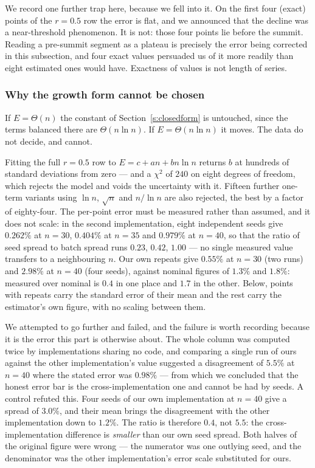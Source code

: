\documentclass[11pt,a4paper]{article}
\begin{document}
We record one further trap here, because we fell into it.  On the first four (exact) points of
the $r=0.5$ row the error is flat, and we announced that the decline was a near-threshold
phenomenon.  It is not: those four points lie before the summit.  Reading a pre-summit segment
as a plateau is precisely the error being corrected in this subsection, and four exact values
persuaded us of it more readily than eight estimated ones would have.  Exactness of values is
not length of series.

\subsubsection*{Why the growth form cannot be chosen}
If $E=\Theta(n)$ the constant of Section~\ref{s:closedform} is untouched, since the terms balanced there are
$\Theta(n\ln n)$.  If $E=\Theta(n\ln n)$ it moves.  The data do not decide, and cannot.

Fitting the full $r=0.5$ row to $E=c+an+bn\ln n$ returns $b$ at hundreds of standard deviations
from zero --- and a $\chi^2$ of $240$ on eight degrees of freedom, which rejects the model and
voids the uncertainty with it.  Fifteen further one-term variants using $\ln n$, $\sqrt n$ and
$n/\ln n$ are also rejected, the best by a factor of eighty-four.  The per-point error must be measured rather than assumed, and it does not scale: in the second
implementation, eight independent seeds give $0.262\%$ at $n=30$, $0.404\%$ at $n=35$ and
$0.979\%$ at $n=40$, so that the ratio of seed spread to batch spread runs $0.23$, $0.42$, $1.00$
--- no single measured value transfers to a neighbouring $n$.  Our own repeats give $0.55\%$ at
$n=30$ (two runs) and $2.98\%$ at $n=40$ (four seeds), against nominal figures of $1.3\%$ and
$1.8\%$: measured over nominal is $0.4$ in one place and $1.7$ in the other.  Below, points with
repeats carry the standard error of their mean and the rest carry the estimator's own figure,
with no scaling between them.

We attempted to go further and failed, and the failure is worth recording because it is the
error this part is otherwise about.  The whole column was computed twice by implementations
sharing no code, and comparing a single run of ours against the other implementation's value
suggested a disagreement of $5.5\%$ at $n=40$ where the stated error was $0.98\%$ --- from which
we concluded that the honest error bar is the cross-implementation one and cannot be had by
seeds.  A control refuted this.  Four seeds of our own implementation at $n=40$ give a spread of
$3.0\%$, and their mean brings the disagreement with the other implementation down to $1.2\%$.
The ratio is therefore $0.4$, not $5.5$: the cross-implementation difference is \emph{smaller}
than our own seed spread.  Both halves of the original figure were wrong --- the numerator was
one outlying seed, and the denominator was the other implementation's error scale substituted
for ours.
\end{document}
